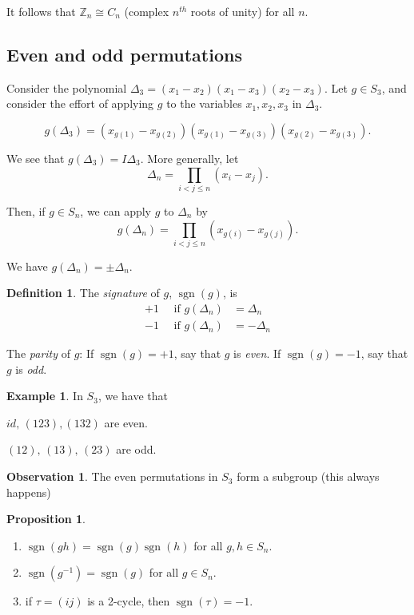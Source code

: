 \documentclass{article}
\theoremstyle{definition} \newtheorem*{definition}{Definition}
\newtheorem{proposition}[theorem]{Proposition}
\newtheorem*{exmp}{Example} \newtheorem*{exmps}{Examples}
\newtheorem*{obvs}{Observation}
\newcommand{\dtn}{\Delta_n} \newcommand{\gene}[1]{\langle #1 \rangle}
\newcommand{\ism}{\cong} \newcommand{\elemt}[2]{#1_{{#2}\sigma(#2)}}
\DeclareMathOperator{\sgn}{sgn} \DeclareMathOperator{\id}{id}
\begin{document}
\begin{remark} It follows that $\mathbb{Z}_n \ism C_n$ (complex $n^{th}$ roots
  of unity) for all $n$.  \end{remark}

\subsection{Even and odd permutations}

Consider the polynomial $\Delta_3 = (x_1 - x_2)(x_1 - x_3) (x_2 - x_3)$.  Let
$g \in S_3$, and consider the effort of applying $g$ to the variables $x_1,
x_2, x_3$ in $\Delta_3$.

$$g(\Delta_3) = (x_{g(1)} - x_{g(2)})(x_{g(1)} - x_{g(3)})(x_{g(2)} -
x_{g(3)}).$$

\noindent We see that $g(\Delta_3)=I\Delta_3$. More generally, let $$\Delta_n =
\prod_{i<j\leq n} (x_i - x_j ). $$ 

\noindent Then, if $g \in S_n$, we can apply $g$ to $\Delta_n$ by $$g(\Delta_n)
= \prod_{i<j\leq n}(x_{g(i)} - x_{g(j)}).$$

\noindent We have $g(\Delta_n) = \pm\Delta_n$.\\ \begin{definition} The
  \emph{signature} of $g$, $\sgn(g)$, is \begin{align*} +1 \quad \text{ if }
    g(\dtn) &= \dtn \\ -1 \quad \text{ if } g(\dtn) &= -\dtn \end{align*}
\end{definition}

The \emph{parity} of $g$: If $\sgn(g)=+1$, say that $g$ is \emph{even}.  If
$\sgn(g)=-1$, say that $g$ is \emph{odd}.\\

\begin{exmp}
  
In $S_3$, we have that 

$id,\,(1 2 3), (1 3 2)$ are even.

$(1 2),\, (1 3),\,(2 3)$ are odd.\\ \end{exmp} \begin{obvs}
  
The even permutations in $S_3$ form a subgroup (this always happens)\\
\end{obvs}


\begin{proposition} \label{prp:sgn}\hfill \begin{enumerate} \item
        $\sgn(gh)=\sgn(g)\sgn(h)$ for all $g,h \in S_n$.  \item
        $\sgn(g^{-1})=\sgn(g)$ for all $g \in S_n$.  \item if $\tau=(i j)$ is a
          2-cycle, then $\sgn(\tau)=-1$.  \end{enumerate} \end{proposition}
\end{document}
